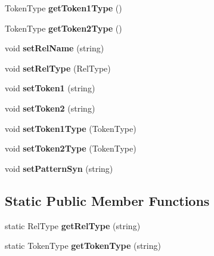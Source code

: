 \begin{DoxyCompactItemize}
\item 
\hypertarget{class_relationship_aed338d5ec0c73f16d85a195db180e7a5}{Token\+Type {\bfseries get\+Token1\+Type} ()}\label{class_relationship_aed338d5ec0c73f16d85a195db180e7a5}

\item 
\hypertarget{class_relationship_afc682811c1eacbe3c61fe8d49ed54800}{Token\+Type {\bfseries get\+Token2\+Type} ()}\label{class_relationship_afc682811c1eacbe3c61fe8d49ed54800}

\item 
\hypertarget{class_relationship_a91a15402ae099d2fa6c27f20a2ab77cf}{void {\bfseries set\+Rel\+Name} (string)}\label{class_relationship_a91a15402ae099d2fa6c27f20a2ab77cf}

\item 
\hypertarget{class_relationship_a2cc1858dbb100bf5f0c6c928acf96da0}{void {\bfseries set\+Rel\+Type} (Rel\+Type)}\label{class_relationship_a2cc1858dbb100bf5f0c6c928acf96da0}

\item 
\hypertarget{class_relationship_a250c4a45bbce0190d4daa93d9e58f623}{void {\bfseries set\+Token1} (string)}\label{class_relationship_a250c4a45bbce0190d4daa93d9e58f623}

\item 
\hypertarget{class_relationship_aede8b379101ef74814be6824ba5cd78b}{void {\bfseries set\+Token2} (string)}\label{class_relationship_aede8b379101ef74814be6824ba5cd78b}

\item 
\hypertarget{class_relationship_a903f74da986734acdfe50cd878b638ec}{void {\bfseries set\+Token1\+Type} (Token\+Type)}\label{class_relationship_a903f74da986734acdfe50cd878b638ec}

\item 
\hypertarget{class_relationship_a8c2ec8c9420e910a80d4239a2cb4b103}{void {\bfseries set\+Token2\+Type} (Token\+Type)}\label{class_relationship_a8c2ec8c9420e910a80d4239a2cb4b103}

\item 
\hypertarget{class_relationship_ada08f5d0b79be0879ece6fb1951c1faf}{void {\bfseries set\+Pattern\+Syn} (string)}\label{class_relationship_ada08f5d0b79be0879ece6fb1951c1faf}

\end{DoxyCompactItemize}
\subsection*{Static Public Member Functions}
\begin{DoxyCompactItemize}
\item 
\hypertarget{class_relationship_a4330565fb9ccfd008a3b3a49760f9e81}{static Rel\+Type {\bfseries get\+Rel\+Type} (string)}\label{class_relationship_a4330565fb9ccfd008a3b3a49760f9e81}

\item 
\hypertarget{class_relationship_aac2a8c8735027f7c867354528db5e7b5}{static Token\+Type {\bfseries get\+Token\+Type} (string)}\label{class_relationship_aac2a8c8735027f7c867354528db5e7b5}

\end{DoxyCompactItemize}


